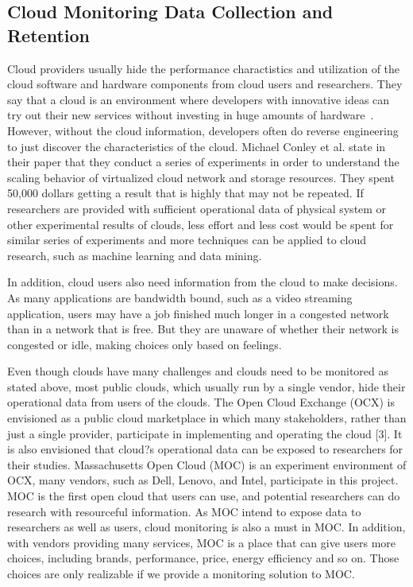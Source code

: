 \subsection{Cloud Monitoring Data Collection and Retention}

Cloud providers usually hide the performance charactistics and utilization of the cloud software and hardware components from cloud users and researchers. They say that a cloud is an environment where developers with innovative ideas can try out their new services without investing in huge amounts of hardware~\cite{Armbrust2009}. However, without the cloud information, developers often do reverse engineering to just discover the characteristics of the cloud. Michael Conley et al. state in their paper that they conduct a series of experiments in order to understand the scaling behavior of virtualized cloud network and storage resources. They spent 50,000 dollars getting a result that is highly that may not be repeated. If researchers are provided with sufficient operational data of physical system or other experimental results of clouds, less effort and less cost would be spent for similar series of experiments and more techniques can be applied to cloud research, such as machine learning and data mining.


  In addition, cloud users also need information from the cloud to make decisions. As many applications are bandwidth bound, such as a video streaming application, users may have a job finished much longer in a congested network than in a network that is free. But they are unaware of whether their network is congested or idle, making choices only based on feelings. 


  Even though clouds have many challenges and clouds need to be monitored as stated above, most public clouds, which usually run by a single vendor, hide their operational data from users of the clouds. The Open Cloud Exchange (OCX) is envisioned as a public cloud marketplace in which many stakeholders, rather than just a single provider, participate in implementing and operating the cloud [3]. It is also envisioned that cloud?s operational data can be exposed to researchers for their studies. Massachusetts Open Cloud (MOC) is an experiment environment of OCX, many vendors, such as Dell, Lenovo, and Intel, participate in this project. MOC is the first open cloud that users can use, and potential researchers can do research with resourceful information. As MOC intend to expose data to researchers as well as users, cloud monitoring is also a must in MOC. In addition, with vendors providing many services, MOC is a place that can give users more choices, including brands, performance, price, energy efficiency and so on. Those choices are only realizable if we provide a monitoring solution to MOC. 

